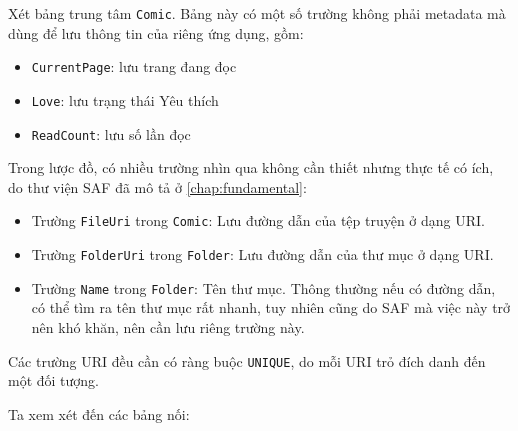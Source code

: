 \documentclass[../../../../thesis]{subfiles}
\begin{document}
Xét bảng trung tâm \texttt{Comic}. Bảng này có một số trường không phải metadata
mà dùng để lưu thông tin của riêng ứng dụng, gồm:

\begin{itemize}
    \item
        \texttt{CurrentPage}: lưu trang đang đọc
    \item
        \texttt{Love}: lưu trạng thái Yêu thích
    \item
        \texttt{ReadCount}: lưu số lần đọc
\end{itemize}

Trong lược đồ, có nhiều trường nhìn qua không cần thiết nhưng thực tế có ích, do
thư viện SAF đã mô tả ở \autoref{chap:fundamental}:

\begin{itemize}
    \item
        Trường \texttt{FileUri} trong \texttt{Comic}: Lưu đường dẫn của tệp
        truyện ở dạng URI.
    \item
        Trường \texttt{FolderUri} trong \texttt{Folder}: Lưu đường dẫn của thư
        mục ở dạng URI.
\end{itemize}

\begin{itemize}[resume, before = \vspace*{-\dimexpr\topsep+\partopsep\relax}]
    \item
        Trường \texttt{Name} trong \texttt{Folder}: Tên thư mục. Thông thường
        nếu có đường dẫn, có thể tìm ra tên thư mục rất nhanh, tuy nhiên cũng do
        SAF mà việc này trở nên khó khăn, nên cần lưu riêng trường này.
\end{itemize}

Các trường URI đều cần có ràng buộc \texttt{UNIQUE}, do mỗi URI trỏ đích danh
đến một đối tượng.

Ta xem xét đến các bảng nối:
\end{document}
